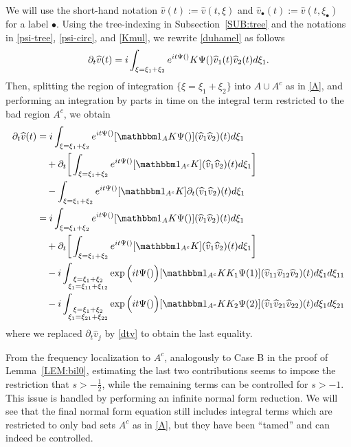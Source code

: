 \documentclass[%
11pt,  reqno]{amsart}
\makeatletter
\newcommand{\5}{\textup{V}}
\newcommand{\ft}{\widehat}
\newcommand{\ind}{\mathbbm 1}
\newcommand{\dt}{\partial_t}
\theoremstyle{remark}
\newcommand{\bul}{\bullet}
\def\<#1>{\csname MH@symb@#1\endcsname}
\numberwithin{equation}{section}
\numberwithin{theorem}{section}
\makeatother
\begin{document}
We will use the short-hand notation $\ft v(t) := \ft v(t,\xi)$ and $\ft v_\bul(t) := \ft v(t,\xi_\bul)$ for a label $\bul$. Using the tree-indexing in Subsection~\ref{SUB:tree} and the notations in \eqref{psi-tree}, \eqref{psi-circ}, and \eqref{Kmul}, we rewrite \eqref{duhamel} as follows
\begin{align}
\label{duhamel2}
\dt\ft v(t) =  i \int_{\xi = \xi_1 + \xi_2} e^{it \Psi(\<1>)}  K \Psi(\<1>)   \widehat{v}_{1} (t) \widehat{v}_{2} (t)
d\xi_{1}.
\end{align}
Then, splitting the region of integration $\{\xi=\xi_1+\xi_2\}$ into $A\cup A^c$ as in \eqref{A}, and performing an integration by parts in time on the integral term restricted to the bad region $A^c$, we obtain
\begin{align}
\label{NFE01}
\begin{split}
\dt\ft v(t)  
&=
i  \int_{\xi = \xi_1 + \xi_2} e^{it \Psi(\<1>)} 
[ \ind_{A} K \Psi(\<1>)   ]
(\ft v_{1} \ft v_{2} )(t)
d\xi_{1} 
\\
&
\quad 
+ \dt\bigg[ \int_{\xi = \xi_1 + \xi_2} e^{it \Psi(\<1>)} 
[\ind_{A^c}
 K ] 
(\ft v_{1} \ft v_{2} )(t)
d\xi_{1} 
\bigg]
\\
&
\quad 
-
   \int_{\xi = \xi_1 + \xi_2} e^{it \Psi(\<1>)} 
[ \ind_{A^c} K ]
\partial_{t} (\ft v_{1} \ft v_{2} )(t)
d\xi_{1} 
\\
& =
 i  \int_{\xi = \xi_1 + \xi_2} e^{it \Psi(\<1>)} 
[ \ind_{A} K \Psi(\<1>)   ]
(\ft v_{1} \ft v_{2} )(t)
d\xi_{1}  
\\
&
\quad 
+  \dt\bigg[ \int_{\xi = \xi_1 + \xi_2} e^{it \Psi(\<1>)} 
[\ind_{A^c}
 K ] 
(\ft v_{1} \ft v_{2} )(t)
d\xi_{1} 
\bigg]
\\
&
\quad 
- i
 \int_{\substack{\xi = \xi_1 + \xi_2 \\ \xi_1 = \xi_{11}+ \xi_{12}  }} \exp\Big(it \Psi(\<21>) \Big)
[ \ind_{A^c} K K_1 \Psi(1) ]
 (\ft v_{11} \ft v_{12} \ft v_2 )(t)
d\xi_{1} d\xi_{11} 
\\
&
\quad 
-i  \int_{\substack{\xi = \xi_1 + \xi_2 \\ \xi_1 = \xi_{21}+ \xi_{22}  }} \exp\Big(it \Psi(\<22>) \Big)
[ \ind_{A^c} K K_2 \Psi(2) ]
 (\ft v_{1} \ft v_{21} \ft v_{22} )(t)
d\xi_{1} d\xi_{21}
\end{split}
\end{align}
where we replaced $\dt \ft v_j$ by \eqref{dtv} to obtain the last equality. 


{\color{red}  From the frequency localization to $A^c$, analogously to Case B in the proof of Lemma~\ref{LEM:bil0}, estimating the last two contributions seems to impose the restriction that $s>-\frac12$, while the remaining terms can be controlled for $s>-1$. This issue is handled by performing an infinite normal form reduction. We will see that the final normal form equation still includes integral terms which are restricted to only bad sets $A^c$ as in \eqref{A}, but they have been ``tamed'' and can indeed be controlled.} 
\end{document}
